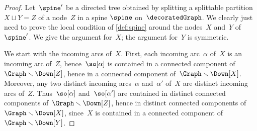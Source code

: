 \documentclass{amsart}
\theoremstyle{definition}
\newcommand{\ssm}{\smallsetminus} %
\begin{document}
\begin{proof}
  Let~$\spine'$ be a directed tree obtained by splitting a splittable partition~$X \sqcup Y = Z$ of a node~$Z$ in a spine $\spine$ on~$\decoratedGraph$.
  We clearly just need to prove the local condition of \cref{def:spine} around the nodes~$X$ and~$Y$ of~$\spine'$.
  We give the argument for~$X$; the argument for~$Y$ is symmetric.
  
  We start with the incoming arcs of~$X$.
  First, each incoming arc~$\alpha$ of~$X$ is an incoming arc of~$Z$, hence~$\so[\alpha]$ is contained in a connected component of~$\Graph \ssm \Down[Z]$, hence in a connected component of~$\Graph \ssm \Down[X]$.
  Moreover, any two distinct incoming arcs~$\alpha$ and~$\alpha'$ of~$X$ are distinct incoming arcs of~$Z$. Thus~$\so[\alpha]$ and~$\so[\alpha']$ are contained in distinct connected components of~$\Graph \ssm \Down[Z]$, hence in distinct connected components of~$\Graph \ssm \Down[X]$, since~$X$ is contained in a connected component of~$\Graph \ssm \Down[Y]$.


\end{proof}
\end{document}
